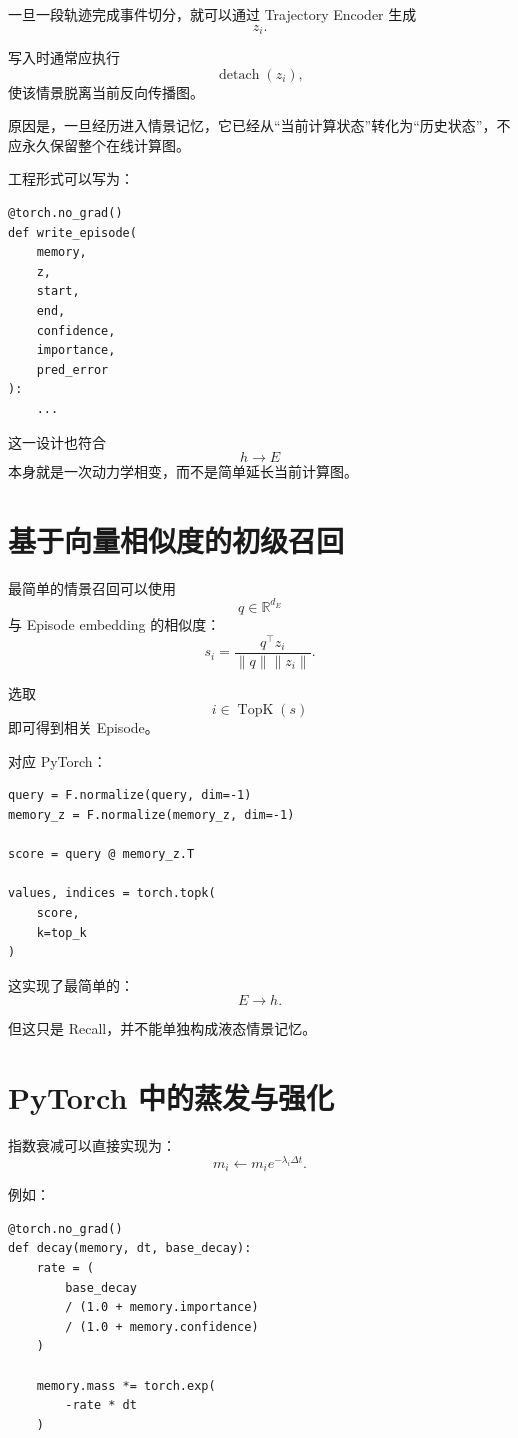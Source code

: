 一旦一段轨迹完成事件切分，就可以通过 Trajectory Encoder 生成
\[
z_i.
\]

写入时通常应执行
\[
\operatorname{detach}(z_i),
\]
使该情景脱离当前反向传播图。

原因是，一旦经历进入情景记忆，它已经从“当前计算状态”转化为“历史状态”，不应永久保留整个在线计算图。

工程形式可以写为：

\begin{verbatim}
@torch.no_grad()
def write_episode(
    memory,
    z,
    start,
    end,
    confidence,
    importance,
    pred_error
):
    ...
\end{verbatim}

这一设计也符合
\[
\boxed{
h\rightarrow E
}
\]
本身就是一次动力学相变，而不是简单延长当前计算图。

\section{基于向量相似度的初级召回}

最简单的情景召回可以使用
\[
q
\in
\mathbb R^{d_E}
\]
与 Episode embedding 的相似度：
\[
s_i
=
\frac{
q^\top z_i
}{
\|q\|\|z_i\|
}.
\]

选取
\[
i\in
\operatorname{TopK}(s)
\]
即可得到相关 Episode。

对应 PyTorch：

\begin{verbatim}
query = F.normalize(query, dim=-1)
memory_z = F.normalize(memory_z, dim=-1)

score = query @ memory_z.T

values, indices = torch.topk(
    score,
    k=top_k
)
\end{verbatim}

这实现了最简单的：
\[
\boxed{
E\rightarrow h.
}
\]

但这只是 Recall，并不能单独构成液态情景记忆。

\section{PyTorch 中的蒸发与强化}

指数衰减可以直接实现为：
\[
m_i
\leftarrow
m_i
e^{-\lambda_i\Delta t}.
\]

例如：

\begin{verbatim}
@torch.no_grad()
def decay(memory, dt, base_decay):
    rate = (
        base_decay
        / (1.0 + memory.importance)
        / (1.0 + memory.confidence)
    )

    memory.mass *= torch.exp(
        -rate * dt
    )
\end{verbatim}

